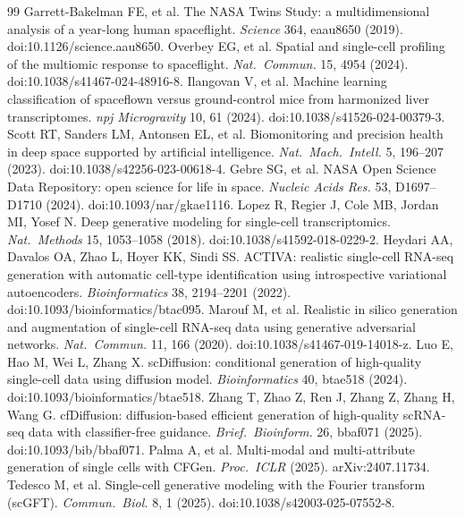 \documentclass[11pt]{article}
\begin{document}
\begin{thebibliography}{99}
\small
{} Garrett-Bakelman FE, et al. The NASA Twins Study: a multidimensional analysis of a year-long human spaceflight. \textit{Science} 364, eaau8650 (2019). doi:10.1126/science.aau8650.
 Overbey EG, et al. Spatial and single-cell profiling of the multiomic response to spaceflight. \textit{Nat.\ Commun.} 15, 4954 (2024). doi:10.1038/s41467-024-48916-8.
 Ilangovan V, et al. Machine learning classification of spaceflown versus ground-control mice from harmonized liver transcriptomes. \textit{npj Microgravity} 10, 61 (2024). doi:10.1038/s41526-024-00379-3.
 Scott RT, Sanders LM, Antonsen EL, et al. Biomonitoring and precision health in deep space supported by artificial intelligence. \textit{Nat.\ Mach.\ Intell.} 5, 196--207 (2023). doi:10.1038/s42256-023-00618-4.
 Gebre SG, et al. NASA Open Science Data Repository: open science for life in space. \textit{Nucleic Acids Res.} 53, D1697--D1710 (2024). doi:10.1093/nar/gkae1116.
 Lopez R, Regier J, Cole MB, Jordan MI, Yosef N. Deep generative modeling for single-cell transcriptomics. \textit{Nat.\ Methods} 15, 1053--1058 (2018). doi:10.1038/s41592-018-0229-2.
 Heydari AA, Davalos OA, Zhao L, Hoyer KK, Sindi SS. ACTIVA: realistic single-cell RNA-seq generation with automatic cell-type identification using introspective variational autoencoders. \textit{Bioinformatics} 38, 2194--2201 (2022). doi:10.1093/bioinformatics/btac095.
 Marouf M, et al. Realistic in silico generation and augmentation of single-cell RNA-seq data using generative adversarial networks. \textit{Nat.\ Commun.} 11, 166 (2020). doi:10.1038/s41467-019-14018-z.
 Luo E, Hao M, Wei L, Zhang X. scDiffusion: conditional generation of high-quality single-cell data using diffusion model. \textit{Bioinformatics} 40, btae518 (2024). doi:10.1093/bioinformatics/btae518.
 Zhang T, Zhao Z, Ren J, Zhang Z, Zhang H, Wang G. cfDiffusion: diffusion-based efficient generation of high-quality scRNA-seq data with classifier-free guidance. \textit{Brief.\ Bioinform.} 26, bbaf071 (2025). doi:10.1093/bib/bbaf071.
 Palma A, et al. Multi-modal and multi-attribute generation of single cells with CFGen. \textit{Proc.\ ICLR} (2025). arXiv:2407.11734.
 Tedesco M, et al. Single-cell generative modeling with the Fourier transform (scGFT). \textit{Commun.\ Biol.} 8, 1 (2025). doi:10.1038/s42003-025-07552-8.

\end{thebibliography}
\end{document}
